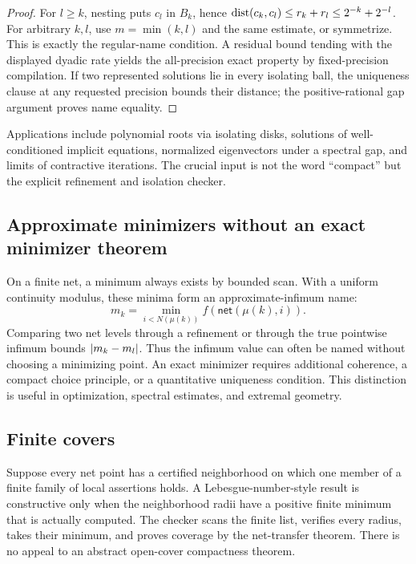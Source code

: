 \begin{proof}
For \(l\ge k\), nesting puts \(c_l\) in \(B_k\), hence
\(\operatorname{dist}(c_k,c_l)\le r_k+r_l\le2^{-k}+2^{-l}\).  For arbitrary \(k,l\), use
\(m=\min(k,l)\) and the same estimate, or symmetrize.  This is exactly the
regular-name condition.  A residual bound tending with the displayed dyadic
rate yields the all-precision exact property by fixed-precision compilation.
If two represented solutions lie in every isolating ball, the uniqueness
clause at any requested precision bounds their distance; the positive-rational
gap argument proves name equality.
\end{proof}

Applications include polynomial roots via isolating disks, solutions of
well-conditioned implicit equations, normalized eigenvectors under a spectral
gap, and limits of contractive iterations.  The crucial input is not the word
``compact'' but the explicit refinement and isolation checker.

\subsection{Approximate minimizers without an exact minimizer theorem}

On a finite net, a minimum always exists by bounded scan.  With a uniform
continuity modulus, these minima form an approximate-infimum name:
\[
 m_k=\min_{i<N(\mu(k))} f(\mathsf{net}(\mu(k),i)).
\]
Comparing two net levels through a refinement or through the true pointwise
infimum bounds \(\left|m_k-m_l\right|\).  Thus the infimum value can often be named
without choosing a minimizing point.  An exact minimizer requires additional
coherence, a compact choice principle, or a quantitative uniqueness condition.
This distinction is useful in optimization, spectral estimates, and extremal
geometry.

\subsection{Finite covers}

Suppose every net point has a certified neighborhood on which one member of a
finite family of local assertions holds.  A Lebesgue-number-style result is
constructive only when the neighborhood radii have a positive finite minimum
that is actually computed.  The checker scans the finite list, verifies every
radius, takes their minimum, and proves coverage by the net-transfer theorem.
There is no appeal to an abstract open-cover compactness theorem.

